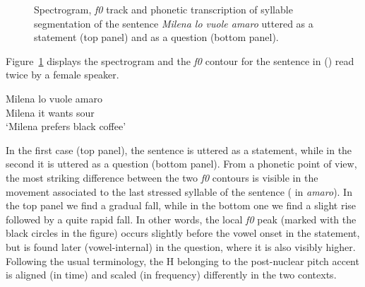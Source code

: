 \begin{figure}
\centering
{}
\caption{Spectrogram, \textit{f0} track and phonetic transcription of syllable segmentation of the sentence \textit{Milena lo vuole amaro} uttered as a statement (top panel) and as a question (bottom panel).}
\label{fig201}\end{figure}

Figure~\ref{fig201} displays the spectrogram and the \textit{f0} contour for the sentence in () read twice by a female speaker. 

\ea
\gll Milena lo vuole amaro\\
Milena it wants sour\\
\glt ‘Milena prefers black coffee’
\z

In the first case (top panel), the sentence is uttered as a statement, while in the second it is uttered as a question (bottom panel). From a phonetic point of view, the most striking difference between the two \textit{f0} contours is visible in the movement associated to the last stressed syllable of the sentence ( in \textit{amaro}). In the top panel we find a gradual fall, while in the bottom one we find a slight rise followed by a quite rapid fall. In other words, the local \textit{f0} peak (marked with the black circles in the figure) occurs slightly before the vowel onset in the statement, but is found later (vowel-internal) in the question, where it is also visibly higher. Following the usual terminology, the H belonging to the post-nuclear pitch accent is aligned (in time) and scaled (in frequency) differently in the two contexts.

